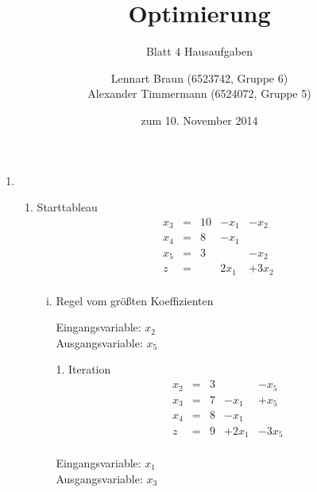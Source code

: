 \documentclass[a4paper]{scrartcl}
\title{Optimierung}
\subtitle{Blatt 4 Hausaufgaben}
\author{
	Lennart Braun (6523742, Gruppe 6) \\
    Alexander Timmermann (6524072, Gruppe 5)
}
\date{zum 10. November 2014}
\begin{document}
\maketitle

\begin{enumerate}
    \item %
        \begin{enumerate}
            \item
                Starttableau
                \begin{equation}
                    \begin{array}{rcrrr}
                        x_3 & = & 10 & -x_1 & -x_2 \\
                        x_4 & = & 8 & -x_1 &  \\
                        x_5 & = & 3 &  & -x_2 \\
                        \hline
                        z   & = &   & 2x_1 & +3x_2 \\
                    \end{array}
                \end{equation}

                \begin{enumerate}[(i)]
                    \item Regel vom größten Koeffizienten

                        Eingangsvariable: $x_2$ \\
                        Ausgangsvariable: $x_5$

                        1. Iteration
                        \begin{equation}
                            \begin{array}{rcrrr}
                                x_2 & = & 3 &  & -x_5 \\
                                x_3 & = & 7 & -x_1 & +x_5 \\
                                x_4 & = & 8 & -x_1 &  \\
                                \hline
                                z   & = & 9 & +2x_1 & -3x_5 \\
                            \end{array}
                        \end{equation}

                        Eingangsvariable: $x_1$ \\
                        Ausgangsvariable: $x_3$


\end{enumerate}
\end{enumerate}
\end{enumerate}
\end{document}
